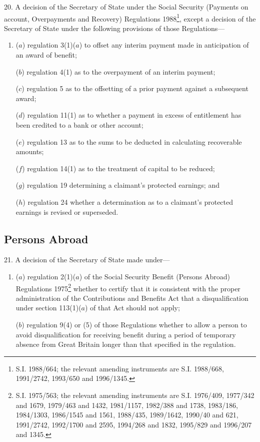 \documentclass[12pt,a4paper]{article}
\begin{document}
20.  A decision of the Secretary of State under the Social Security (Payments on account, Overpayments and Recovery) Regulations 1988\footnote{\frenchspacing S.I. 1988/664; the relevant amending instruments are S.I. 1988/668, 1991/2742, 1993/650 and 1996/1345.}, except a decision of the Secretary of State under the following provisions of those Regulations—
\begin{enumerate}\item[]
($a$) regulation 3(1)($a$) to offset any interim payment made in anticipation of an award of benefit;

($b$) regulation 4(1) as to the overpayment of an interim payment;

($c$) regulation 5 as to the offsetting of a prior payment against a subsequent award;

($d$) regulation 11(1) as to whether a payment in excess of entitlement has been credited to a bank or other account;

($e$) regulation 13 as to the sums to be deducted in calculating recoverable amounts;

($f$) regulation 14(1) as to the treatment of capital to be reduced;

($g$) regulation 19 determining a claimant’s protected earnings; and

($h$) regulation 24 whether a determination as to a claimant’s protected earnings is revised or superseded.
\end{enumerate}

\subsection*{Persons Abroad}

21.  A decision of the Secretary of State made under—
\begin{enumerate}\item[]
($a$) regulation 2(1)($a$) of the Social Security Benefit (Persons Abroad) Regulations 1975\footnote{\frenchspacing S.I. 1975/563; the relevant amending instruments are S.I. 1976/409, 1977/342 and 1679, 1979/463 and 1432, 1981/1157, 1982/388 and 1738, 1983/186, 1984/1303, 1986/1545 and 1561, 1988/435, 1989/1642, 1990/40 and 621, 1991/2742, 1992/1700 and 2595, 1994/268 and 1832, 1995/829 and 1996/207 and 1345.} whether to certify that it is consistent with the proper administration of the Contributions and Benefits Act that a disqualification under section 113(1)($a$) of that Act should not apply;

($b$) regulation 9(4) or (5) of those Regulations whether to allow a person to avoid disqualification for receiving benefit during a period of temporary absence from Great Britain longer than that specified in the regulation.
\end{enumerate}
\end{document}
